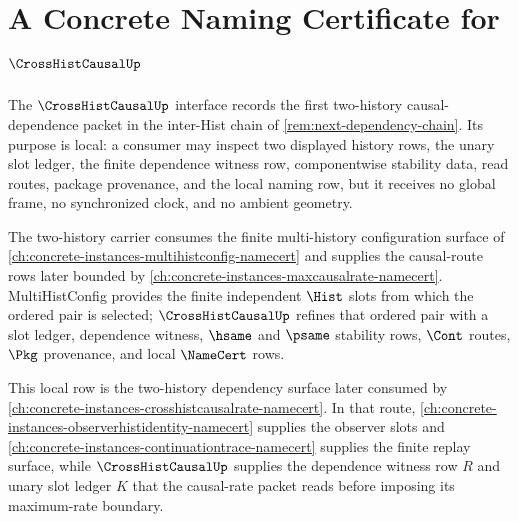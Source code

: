 \chapter{A Concrete Naming Certificate for $\CrossHistCausalUp$}
\label{ch:concrete-instances-crosshistcausal-namecert}

The $\CrossHistCausalUp$ interface records the first two-history causal-dependence packet in the inter-Hist chain of \autoref{rem:next-dependency-chain}. Its purpose is local: a consumer may inspect two displayed history rows, the unary slot ledger, the finite dependence witness row, componentwise stability data, read routes, package provenance, and the local naming row, but it receives no global frame, no synchronized clock, and no ambient geometry.

The two-history carrier consumes the finite multi-history configuration surface of \autoref{ch:concrete-instances-multihistconfig-namecert} and supplies the causal-route rows later bounded by \autoref{ch:concrete-instances-maxcausalrate-namecert}. MultiHistConfig provides the finite independent $\Hist$ slots from which the ordered pair is selected; $\CrossHistCausalUp$ refines that ordered pair with a slot ledger, dependence witness, $\hsame$ and $\psame$ stability rows, $\Cont$ routes, $\Pkg$ provenance, and local $\NameCert$ rows.

This local row is the two-history dependency surface later consumed by \autoref{ch:concrete-instances-crosshistcausalrate-namecert}. In that route, \autoref{ch:concrete-instances-observerhistidentity-namecert} supplies the observer slots and \autoref{ch:concrete-instances-continuationtrace-namecert} supplies the finite replay surface, while $\CrossHistCausalUp$ supplies the dependence witness row $R$ and unary slot ledger $K$ that the causal-rate packet reads before imposing its maximum-rate boundary.

